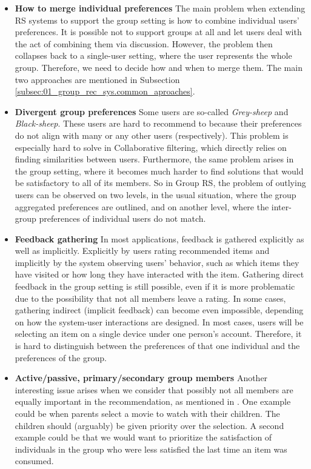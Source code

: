 \begin{itemize}
    \item \textbf{How to merge individual preferences} \newline
        The main problem when extending RS systems to support the group setting is how to combine individual users' preferences. It is possible not to support groups at all and let users deal with the act of combining them via discussion. However, the problem then collapses back to a single-user setting, where the user represents the whole group. Therefore, we need to decide how and when to merge them. The main two approaches are mentioned in Subsection \ref{subsec:01_group_rec_sys.common_aproaches}.
        
    \item \textbf{Divergent group preferences} \newline
        Some users are so-called \textit{Grey-sheep} and \textit{Black-sheep}. These users are hard to recommend to because their preferences do not align with many or any other users (respectively). This problem is especially hard to solve in Collaborative filtering, which directly relies on finding similarities between users. Furthermore, the same problem arises in the group setting, where it becomes much harder to find solutions that would be satisfactory to all of its members. So in Group RS, the problem of outlying users can be observed on two levels, in the usual situation, where the group aggregated preferences are outlined, and on another level, where the inter-group preferences of individual users do not match.
    \item \textbf{Feedback gathering} \newline
        In most applications, feedback is gathered explicitly as well as implicitly. Explicitly by users rating recommended items and implicitly by the system observing users' behavior, such as which items they have visited or how long they have interacted with the item. Gathering direct feedback in the group setting is still possible, even if it is more problematic due to the possibility that not all members leave a rating. In some cases, gathering indirect (implicit feedback) can become even impossible, depending on how the system-user interactions are designed. In most cases, users will be selecting an item on a single device under one person's account. Therefore, it is hard to distinguish between the preferences of that one individual and the preferences of the group.
    \item \textbf{Active/passive, primary/secondary group members} \newline
        Another interesting issue arises when we consider that possibly not all members are equally important in the recommendation, as mentioned in \cite{deCampos_2009_managing_uncertanity_in_grouprec}. One example could be when parents select a movie to watch with their children. The children should (arguably) be given priority over the selection. A second example could be that we would want to prioritize the satisfaction of individuals in the group who were less satisfied the last time an item was consumed.
        

\end{itemize}
